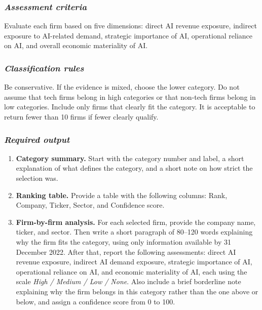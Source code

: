 \documentclass{article}
\begin{document}
{\subsubsection*{\textit{Assessment criteria}}

Evaluate each firm based on five dimensions: direct AI revenue exposure, indirect exposure to AI-related demand, strategic importance of AI, operational reliance on AI, and overall economic materiality of AI.

\subsubsection*{\textit{Classification rules}}

Be conservative. If the evidence is mixed, choose the lower category. Do not assume that tech firms belong in high categories or that non-tech firms belong in low categories. Include only firms that clearly fit the category. It is acceptable to return fewer than 10 firms if fewer clearly qualify.

\subsubsection*{\textit{Required output}}

\begin{enumerate}
    \item \textbf{Category summary.} Start with the category number and label, a short explanation of what defines the category, and a short note on how strict the selection was.
    
    \item \textbf{Ranking table.} Provide a table with the following columns: Rank, Company, Ticker, Sector, and Confidence score.
    
    \item \textbf{Firm-by-firm analysis.} For each selected firm, provide the company name, ticker, and sector. Then write a short paragraph of 80--120 words explaining why the firm fits the category, using only information available by 31 December 2022. After that, report the following assessments: direct AI revenue exposure, indirect AI demand exposure, strategic importance of AI, operational reliance on AI, and economic materiality of AI, each using the scale \textit{High / Medium / Low / None}. Also include a brief borderline note explaining why the firm belongs in this category rather than the one above or below, and assign a confidence score from 0 to 100.
    

\end{enumerate}}
\end{document}

